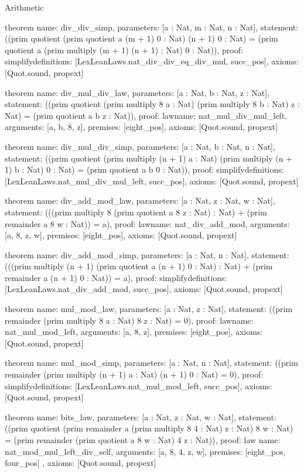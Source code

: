 \begin{lexlean}{Arithmetic}
\begin{semanticmodule}
theorem{
  name: div_div_simp,
  parameters: [a : Nat, m : Nat, n : Nat],
  statement: ((prim quotient (prim quotient a (m + 1) 0 : Nat) (n + 1) 0 : Nat) = (prim quotient a (prim multiply (m + 1) (n + 1) : Nat) 0 : Nat)),
  proof: simplify{definitions: [LexLeanLaws.nat_div_div_eq_div_mul, succ_pos]},
  axioms: [Quot.sound, propext]
}

theorem{
  name: div_mul_div_law,
  parameters: [a : Nat, b : Nat, z : Nat],
  statement: ((prim quotient (prim multiply 8 a : Nat) (prim multiply 8 b : Nat) z : Nat) = (prim quotient a b z : Nat)),
  proof: law{name: nat_mul_div_mul_left, arguments: [a, b, 8, z], premises: [eight_pos]},
  axioms: [Quot.sound, propext]
}

theorem{
  name: div_mul_div_simp,
  parameters: [a : Nat, b : Nat, n : Nat],
  statement: ((prim quotient (prim multiply (n + 1) a : Nat) (prim multiply (n + 1) b : Nat) 0 : Nat) = (prim quotient a b 0 : Nat)),
  proof: simplify{definitions: [LexLeanLaws.nat_mul_div_mul_left, succ_pos]},
  axioms: [Quot.sound, propext]
}

theorem{
  name: div_add_mod_law,
  parameters: [a : Nat, z : Nat, w : Nat],
  statement: (((prim multiply 8 (prim quotient a 8 z : Nat) : Nat) + (prim remainder a 8 w : Nat)) = a),
  proof: law{name: nat_div_add_mod, arguments: [a, 8, z, w], premises: [eight_pos]},
  axioms: [Quot.sound, propext]
}

theorem{
  name: div_add_mod_simp,
  parameters: [a : Nat, n : Nat],
  statement: (((prim multiply (n + 1) (prim quotient a (n + 1) 0 : Nat) : Nat) + (prim remainder a (n + 1) 0 : Nat)) = a),
  proof: simplify{definitions: [LexLeanLaws.nat_div_add_mod, succ_pos]},
  axioms: [Quot.sound, propext]
}

theorem{
  name: mul_mod_law,
  parameters: [a : Nat, z : Nat],
  statement: ((prim remainder (prim multiply 8 a : Nat) 8 z : Nat) = 0),
  proof: law{name: nat_mul_mod_left, arguments: [a, 8, z], premises: [eight_pos]},
  axioms: [Quot.sound, propext]
}

theorem{
  name: mul_mod_simp,
  parameters: [a : Nat, n : Nat],
  statement: ((prim remainder (prim multiply (n + 1) a : Nat) (n + 1) 0 : Nat) = 0),
  proof: simplify{definitions: [LexLeanLaws.nat_mul_mod_left, succ_pos]},
  axioms: [Quot.sound, propext]
}

theorem{
  name: bits_law,
  parameters: [a : Nat, z : Nat, w : Nat],
  statement: ((prim quotient (prim remainder a (prim multiply 8 4 : Nat) z : Nat) 8 w : Nat) = (prim remainder (prim quotient a 8 w : Nat) 4 z : Nat)),
  proof: law{
    name: nat_mod_mul_left_div_self,
    arguments: [a, 8, 4, z, w],
    premises: [eight_pos, four_pos]
  },
  axioms: [Quot.sound, propext]
}


\end{semanticmodule}
\end{lexlean}
